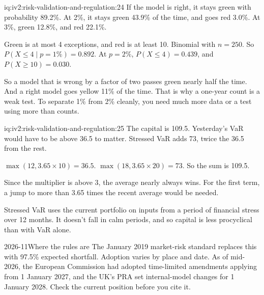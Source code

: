 \begin{solution}{iq:iv2:risk-validation-and-regulation:24}
If the model is right, it stays green with probability 89.2\%. At 2\%, it stays green 43.9\% of the time, and goes red 3.0\%. At 3\%, green 12.8\%, and red 22.1\%.

Green is at most 4 exceptions, and red is at least 10. Binomial with $n = 250$. So $P(X \le 4 \mid p = 1\%) = 0.892$. At $p = 2\%$, $P(X \le 4) = 0.439$, and $P(X \ge 10) = 0.030$.

So a model that is wrong by a factor of two passes green nearly half the time. And a right model goes yellow 11\% of the time. That is why a one-year count is a weak test. To separate 1\% from 2\% cleanly, you need much more data or a test using more than counts.

\end{solution}

\begin{solution}{iq:iv2:risk-validation-and-regulation:25}
The capital is 109.5. Yesterday's VaR would have to be above 36.5 to matter. Stressed VaR adds 73, twice the 36.5 from the rest.

$\max(12, 3.65 \times 10) = 36.5$. $\max(18, 3.65 \times 20) = 73$. So the sum is 109.5.

Since the multiplier is above 3, the average nearly always wins. For the first term, a jump to more than 3.65 times the recent average would be needed.

Stressed VaR uses the current portfolio on inputs from a period of financial stress over 12 months. It doesn't fall in calm periods, and so capital is less procyclical than with VaR alone.

\begin{dated}{2026-11}{Where the rules are}\label{dat:iv2:risk-validation-and-regulation:frtb}
The January 2019 market-risk standard replaces this with 97.5\% expected shortfall. Adoption varies by place and date. As of mid-2026, the European Commission had adopted time-limited amendments applying from 1 January 2027, and the UK's PRA set internal-model changes for 1 January 2028. Check the current position before you cite it.
\end{dated}

\end{solution}

